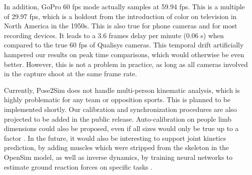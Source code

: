 In addition, GoPro 60 fps mode actually samples at 59.94 fps. This is a multiple of 29.97 fps, which is a holdout from the introduction of color on television in North America in the 1950s. This is also true for phone cameras and for most recording devices. It leads to a 3.6 frames delay per minute (0.06 s) when compared to the true 60 fps of Qualisys cameras. This temporal drift artificially hampered our results on peak time comparisons, which would otherwise be even better. However, this is not a problem in practice, as long as all cameras involved in the capture shoot at the same frame rate.

Currently, Pose2Sim does not handle multi-person kinematic analysis, which is highly problematic for any team or opposition sports. This is planned to be implemented shortly. Our calibration and synchronization procedures are also projected to be added in the public release. Auto-calibration on people limb dimensions could also be proposed, even if all sizes would only be true up to a factor \cite{Liu2022a}. In the future, it would also be interesting to support joint kinetics prediction, by adding muscles which were stripped from the skeleton in the OpenSim model, as well as inverse dynamics, by training neural networks to estimate ground reaction forces on specific tasks \cite{Oh2013, Johnson2018, Mundt2019, Uhlrich2022}.

